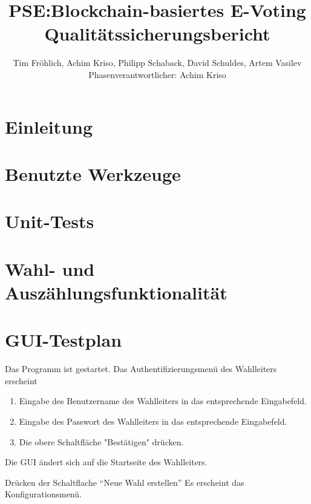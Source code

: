 \documentclass[parskip=full]{scrartcl}
\title{
	PSE:Blockchain-basiertes E-Voting \\
	Qualitätssicherungsbericht
}
\author{Tim Fröhlich, Achim Kriso, Philipp Schaback, David Schuldes, Artem Vasilev\\ Phasenverantwortlicher: Achim Kriso}
\begin{document}
\clearpage
\maketitle
{}
\newpage

\tableofcontents
\newpage
{}

\section{Einleitung}

\section{Benutzte Werkzeuge}

\section{Unit-Tests} %

\section{Wahl- und Auszählungsfunktionalität}

\section{GUI-Testplan}
		{Das Programm ist gestartet.}
		{Das Authentifizierungsmenü des Wahlleiters erscheint}

\teststep{}
		{\begin{enumerate}
				\item Eingabe des Benutzername des Wahlleiters in das entsprechende Eingabefeld.
				\item Eingabe des Passwort des Wahlleiters in das entsprechende Eingabefeld.
				\item Die obere Schaltfläche "Bestätigen" drücken.
		\end{enumerate}}
		{Die GUI ändert sich auf die Startseite des Wahlleiters.}
		
\teststep{}
		{Drücken der Schaltflache \enquote{Neue Wahl erstellen}}
		{Es erscheint das Konfigurationsmenü.}
\end{document}
